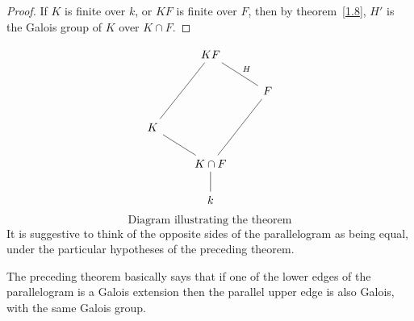\begin{theorem}{}
\begin{proof}
        If $K$ is finite over $k$, or $KF$ is finite over $F$, then by theorem~\ref{1.8}, $H'$ is the Galois group of $K$ over $K\cap F$.
    \end{proof}
\[
\begin{tikzcd}
    &KF \arrow[rd, "H", dash]&\\
    && F \arrow[ddl, dash]\\
    K \arrow[uur, dash] \arrow[dr, dash]&&\\
    &K\cap F \arrow[d,dash]&\\
    &k&
\end{tikzcd}
\]
\[
    \text{Diagram illustrating the theorem}
    \]
It is suggestive to think of the opposite sides of the parallelogram as being equal, under the particular hypotheses of the preceding theorem. \begin{bergman}
    The preceding theorem basically says that if one of the lower edges of the parallelogram is a Galois extension then the parallel upper edge is also Galois, with the same Galois group.
\end{bergman}
\end{theorem}

